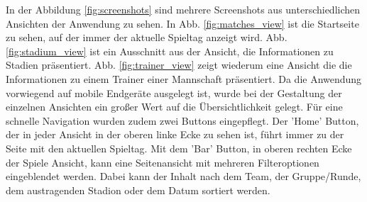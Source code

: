 \documentclass[runningheads,a4paper]{llncs}
\begin{document}
In der Abbildung \ref{fig:screenshots} sind mehrere Screenshots aus unterschiedlichen Ansichten der Anwendung zu sehen. In Abb. \ref{fig:matches_view} ist die Startseite zu sehen, auf der immer der aktuelle Spieltag anzeigt wird. Abb. \ref{fig:stadium_view} ist ein Ausschnitt aus der Ansicht, die Informationen zu Stadien präsentiert. Abb. \ref{fig:trainer_view} zeigt wiederum eine Ansicht die die Informationen zu einem Trainer einer Mannschaft präsentiert. Da die Anwendung vorwiegend auf mobile Endgeräte ausgelegt ist, wurde bei der Gestaltung der einzelnen Ansichten ein großer Wert auf die Übersichtlichkeit gelegt. Für eine schnelle Navigation wurden zudem zwei Buttons eingepflegt. Der 'Home' Button, der in jeder Ansicht in der oberen linke Ecke zu sehen ist, führt immer zu der Seite mit den aktuellen Spieltag. Mit dem 'Bar' Button, in oberen rechten Ecke der Spiele Ansicht, kann eine Seitenansicht mit mehreren Filteroptionen eingeblendet werden. Dabei kann der Inhalt nach dem Team, der Gruppe/Runde, dem austragenden Stadion oder dem Datum sortiert werden.
\end{document}
